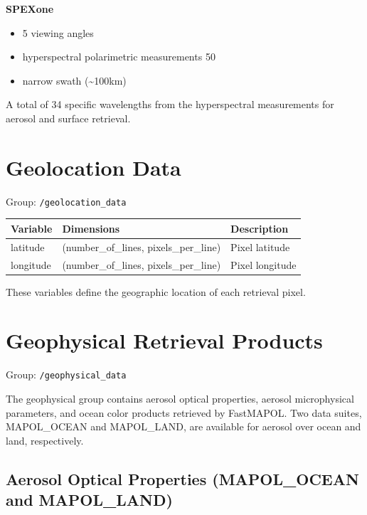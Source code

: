 \documentclass[
  letterpaper,
  open=any]{scrbook}
\providecommand{\tightlist}{%
  \setlength{\itemsep}{0pt}\setlength{\parskip}{0pt}}
\begin{document}
\textbf{SPEXone}

\begin{itemize}
\tightlist
\item
  5 viewing angles\\
\item
  hyperspectral polarimetric measurements 50
\item
  narrow swath (\textasciitilde100km)
\end{itemize}

A total of 34 specific wavelengths from the hyperspectral measurements
for aerosol and surface retrieval.

\section{Geolocation Data}\label{geolocation-data}

Group: \texttt{/geolocation\_data}

\begin{longtable}[]{@{}lll@{}}
\toprule\noalign{}
Variable & Dimensions & Description \\
\midrule\noalign{}
\endhead
\bottomrule\noalign{}
\endlastfoot
latitude & (number\_of\_lines, pixels\_per\_line) & Pixel latitude \\
longitude & (number\_of\_lines, pixels\_per\_line) & Pixel longitude \\
\end{longtable}

These variables define the geographic location of each retrieval pixel.

\section{Geophysical Retrieval
Products}\label{geophysical-retrieval-products}

Group: \texttt{/geophysical\_data}

The geophysical group contains aerosol optical properties, aerosol
microphysical parameters, and ocean color products retrieved by
FastMAPOL. Two data suites, MAPOL\_OCEAN and MAPOL\_LAND, are available
for aerosol over ocean and land, respectively.

\subsection{Aerosol Optical Properties (MAPOL\_OCEAN and
MAPOL\_LAND)}\label{aerosol-optical-properties-mapol_ocean-and-mapol_land}
\end{document}
